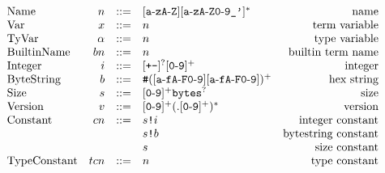 \documentclass[../plutus-core-specification.tex]{subfiles}
\begin{document}
\begin{minipage}{\linewidth}
    \centering
    \[\begin{array}{lrclr}

        \textrm{Name}        & n      & ::= & [\texttt{a}\!\hyphen{}\!\texttt{z}\texttt{A}\!\hyphen{}\!\texttt{Z}][\texttt{a}\!\hyphen{}\!\texttt{zA}\!\hyphen{}\!\texttt{Z0}\!\hyphen{}\!\texttt{9\_'}]^*   & \textrm{name}\\

        \textrm{Var}           & x      & ::= & n & \textrm{term variable}\\
        \textrm{TyVar}         & \alpha & ::= & n & \textrm{type variable}\\
        \textrm{BuiltinName}   & bn     & ::= & n & \textrm{builtin term name}\\
        \textrm{Integer} & i  & ::= & [\texttt{+-}]^?[\texttt{0}\!\hyphen{}\!\texttt{9}]^+ & \textrm{integer}\\

        \textrm{ByteString}   & b  & ::= & \texttt{\#}([\texttt{a}\!\hyphen{}\!\texttt{fA}\!\hyphen{}\!\texttt{F0}\!\hyphen{}\!\texttt{9}][\texttt{a}\!\hyphen{}\!\texttt{fA}\!\hyphen{}\!\texttt{F0}\!\hyphen{}\!\texttt{9}])^+ & \textrm{hex string}\\

        \textrm{Size} & s  & ::= & [\texttt{0}\!\hyphen{}\!\texttt{9}]^+ \texttt{bytes}^? & \textrm{size}\\

        \textrm{Version} & v & ::= & [\texttt{0}\!\hyphen{}\!\texttt{9}]^+(.[\texttt{0}\!\hyphen{}\!\texttt{9}]^+)^* & \textrm{version}\\

        \textrm{Constant} & cn & ::= & \sizedBuiltin{s}{i} & \textrm{integer constant}\\
                          &    &     & \sizedBuiltin{s}{b} & \textrm{bytestring constant}\\
                          &    &     & s & \textrm{size constant}\\
        \textrm{TypeConstant} & tcn    & ::= & n & \textrm{type constant}\\


    \end{array}\]
    \label{fig:Plutus_core_lexical_grammar}
\end{minipage}
\end{document}
